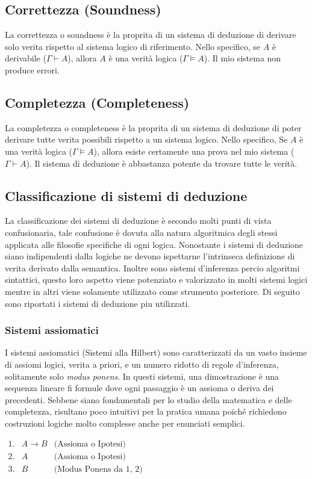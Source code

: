 \subsection{Correttezza (Soundness)} 
La correttezza o soundness è la proprita di un sistema di deduzione di derivare solo verita rispetto al sistema logico di riferimento. Nello specifico,
se $A$ è derivabile ($\Gamma \vdash A$), allora $A$ è una verità logica ($\Gamma \models A$). Il mio sistema non produce errori.

\subsection{Completezza (Completeness)}
La completezza o completeness è la proprita di un sistema di deduzione di poter derivare tutte verita possibili rispetto a un sistema logico. Nello specifico,
Se $A$ è una verità logica ($\Gamma \models A$), allora esiste certamente una prova nel mio sistema ($\Gamma \vdash A$). Il sistema di deduzione è abbastanza 
potente da trovare tutte le verità.    

\subsection{Classificazione di sistemi di deduzione}
La classificazione dei sistemi di deduzione è secondo molti punti di vista confusionaria, tale confusione è dovuta alla natura algoritmica degli stessi applicata alle filosofie specifiche
di ogni logica. Nonostante i sistemi di deduzione siano indipendenti dalla logiche ne devono ispettarne l'intrinseca definizione di verita derivato dalla semantica. Inoltre sono sistemi d'inferenza
percio algoritmi sintattici, questo loro aspetto viene potenziato e valorizzato in molti sistemi logici mentre in altri viene solamente utilizzato come strumento posteriore. Di seguito sono riportati
i sistemi di deduzione piu utilizzati. 

\subsubsection{Sistemi assiomatici}
I sistemi assiomatici (Sistemi alla Hilbert) sono caratterizzati da un vasto insieme di assiomi logici, verita a priori, e un numero ridotto di regole d'inferenza, solitamente solo \emph{modus ponens}.
In questi sistemi, una dimostrazione è una sequenza lineare fi formule dove ogni passaggio è un assioma o deriva dei precedenti. Sebbene siano fondamentali per lo studio della matematica e delle completezza,
risultano poco intuitivi per la pratica umana poiché richiedono costruzioni logiche molto complesse anche per enunciati semplici.
\begin{center}
    $\begin{array}{rll}
        1. & A \to B  & \text{(Assioma o Ipotesi)}      \\
        2. & A        & \text{(Assioma o Ipotesi)}      \\
        3. & B        & \text{(Modus Ponens da 1, 2)}
    \end{array}$
\end{center}

